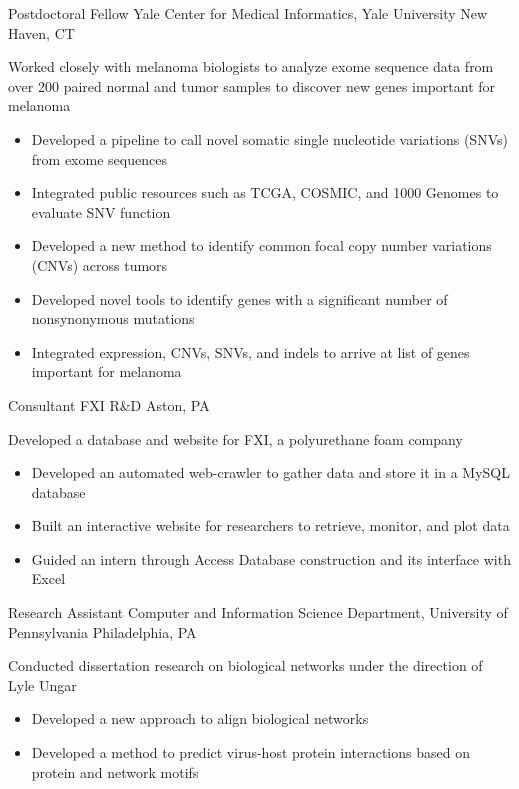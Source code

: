 \documentclass [10pt, letterpaper]{moderncv}
\newcommand\myitem{\item[ $\circ$ ]\hspace*{.1em} }
\begin{document}
         {Postdoctoral Fellow}
         {Yale Center for Medical Informatics,
          Yale University}
         {New Haven, CT}
         {}
         {Worked closely with melanoma biologists to analyze exome sequence data from over 200 paired normal and tumor samples to discover new genes important for melanoma
           \begin{itemize}%
             \setlength{\itemindent}{1.5em}
         \myitem Developed a pipeline to call novel somatic single nucleotide variations (SNVs) from exome sequences
         \myitem Integrated public resources such as TCGA, COSMIC, and 1000 Genomes to evaluate SNV function
         \myitem Developed a new method to identify common focal copy number variations (CNVs) across tumors
         \myitem Developed novel tools to identify genes with a significant number of nonsynonymous mutations
         \myitem Integrated expression, CNVs, SNVs, and indels to arrive at list of genes important for melanoma
           \end{itemize}
           }


         {Consultant}
         {FXI R\&D}
         {Aston, PA}
         {}
         {Developed a database and website for FXI, a polyurethane foam company
           \begin{itemize}
             \setlength{\itemindent}{1.5em}
             \myitem Developed an automated web-crawler to gather data and store it in a MySQL database
             \myitem Built an interactive website for researchers to retrieve, monitor, and plot data
             \myitem Guided an intern through Access Database construction and its interface with Excel
             \end{itemize}
         }

         {Research Assistant}
         {Computer and Information Science Department, 
          University of Pennsylvania}
         {Philadelphia, PA}
         {}
         {Conducted dissertation research on biological networks under the direction of Lyle Ungar 
           \begin{itemize}
             \setlength{\itemindent}{1.5em}
           \myitem Developed a new approach to align biological networks
           \myitem Developed a method to predict virus-host protein interactions  based on protein and network motifs
           \end{itemize}
         }
\end{document}
